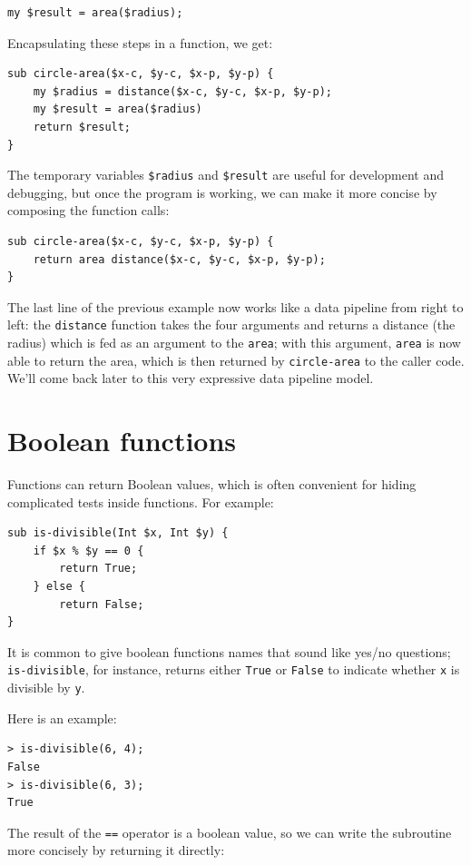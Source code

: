 \begin{verbatim}
my $result = area($radius);
\end{verbatim}
%
Encapsulating these steps in a function, we get:

\begin{verbatim}
sub circle-area($x-c, $y-c, $x-p, $y-p) {
    my $radius = distance($x-c, $y-c, $x-p, $y-p);
    my $result = area($radius)
    return $result;
}
\end{verbatim}
%
The temporary variables {\tt \$radius} and {\tt \$result} are useful for
development and debugging, but once the program is working, we can
make it more concise by composing the function calls:

\begin{verbatim}
sub circle-area($x-c, $y-c, $x-p, $y-p) {
    return area distance($x-c, $y-c, $x-p, $y-p);
}
\end{verbatim}
%

The last line of the previous example now works like a data 
pipeline from right to left: the \verb'distance' function 
takes the four arguments and returns a distance (the radius) 
which is fed as an argument to the \verb'area'; with this 
argument, \verb'area' is now able to return the area, which 
is then returned by \verb'circle-area' to the caller code. 
We'll come back later to this very expressive data pipeline 
model.

\section{Boolean functions}
\label{boolean}

Functions can return Boolean values, which is often convenient for hiding
complicated tests inside functions. For example:

\begin{verbatim}
sub is-divisible(Int $x, Int $y) {
    if $x % $y == 0 {
        return True;
    } else {
        return False;
}
\end{verbatim}
%
It is common to give boolean functions names that sound like yes/no
questions; \verb"is-divisible", for instance, returns either 
{\tt True} or {\tt False} to indicate whether {\tt x} is 
divisible by {\tt y}.

Here is an example:

\begin{verbatim}
> is-divisible(6, 4);
False
> is-divisible(6, 3);
True
\end{verbatim}
%
The result of the {\tt ==} operator is a boolean value, so we 
can write the subroutine more concisely by returning it directly:

